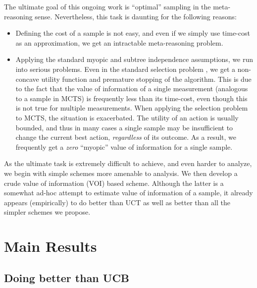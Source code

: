 \documentclass{article}
\begin{document}
The ultimate goal of this ongoing work is ``optimal'' sampling
in the meta-reasoning sense. Nevertheless, this task is daunting for
the following reasons:
\begin{itemize}
\item Defining the cost of a sample is not easy, and even if we simply use time-cost
as an approximation, we get an intractable meta-reasoning problem.
\item Applying the standard myopic and subtree independence assumptions, we run into
serious problems. Even in the standard selection problem \cite{TolpinShimony.blinkered}, we get a non-concave
utility function and premature stopping of the algorithm. This is due to the fact
that the value of information of a single measurement (analogous
to a sample in MCTS) is frequently less than its
time-cost, even though this is not true for multiple measurements.
When applying the selection problem to MCTS, the situation is exacerbated. 
The utility of an action is usually bounded, and thus in many cases a single sample
may be insufficient to change the current best action, {\em regardless} of its
outcome. As a result, we frequently
get a {\em zero} ``myopic'' value of information for a single sample.
\end{itemize}

As the ultimate task is extremely difficult
to achieve, and even harder to analyze, we begin with
simple schemes more amenable to analysis. We then
develop a crude value of information (VOI)
based scheme. Although the latter is a somewhat ad-hoc attempt to
estimate value of information of a sample, it already appears (empirically) to do
better than UCT as well as better than all the simpler schemes we propose.

\section{Main Results}

\subsection{Doing better than UCB}
\end{document}
